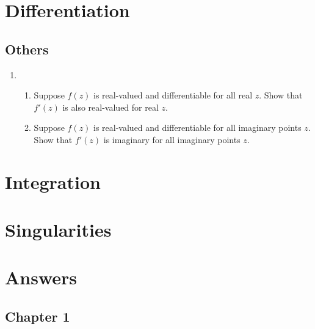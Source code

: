 \documentclass[11pt, oneside]{book}
\begin{document}
\chapter{Differentiation}
	\label{chapter:differentiation}

\section{Others} %
\label{sec:others}

\begin{enumerate}
	\item \begin{enumerate}
		\item Suppose $f(z)$ is real-valued and differentiable for all real $z$. Show that $f'(z)$ is also real-valued for real $z$.
		\item Suppose $f(z)$ is real-valued and differentiable for all imaginary points $z$. Show that $f'(z)$ is imaginary for all imaginary points $z$.
	\end{enumerate}
\end{enumerate}



\chapter{Integration}
	\label{chapter:integration}




\chapter{Singularities}
	\label{chapter:singularities}




\chapter*{Answers}\label{chapter:answers}

\fontsize{9}{11}\selectfont

\section*{Chapter 1} %
\label{sec:chapter_1}
\end{document}

